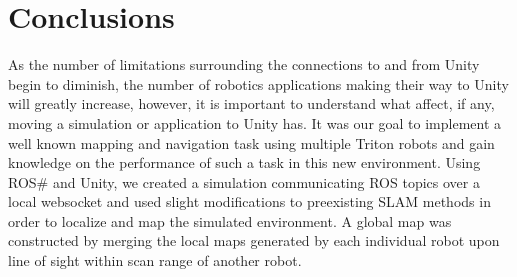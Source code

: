 \documentclass[11pt, conference]{IEEEtran}
\begin{document}


\section{Conclusions}

As the number of limitations surrounding the connections to and from Unity begin to diminish, the number of robotics applications making their way to Unity will greatly increase, however, it is important to understand what affect, if any, moving a simulation or application to Unity has. It was our goal to implement a well known mapping and navigation task using multiple Triton robots and gain knowledge on the performance of such a task in this new environment. Using ROS\# and Unity, we created a simulation communicating ROS topics over a local websocket and used slight modifications to preexisting SLAM methods in order to localize and map the simulated environment. A global map was constructed by merging the local maps generated by each individual robot upon line of sight within scan range of another robot.
\end{document}
